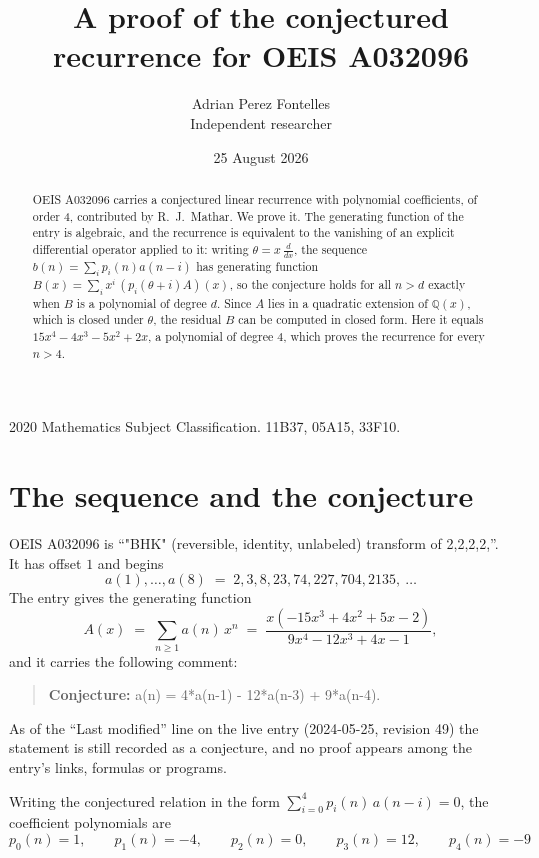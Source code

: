 \documentclass[11pt,a4paper]{article}
\title{A proof of the conjectured recurrence for OEIS A032096}
\author{Adrian Perez Fontelles\\ \small Independent researcher}
\date{25 August 2026}
\theoremstyle{plain}
\theoremstyle{definition}
\begin{document}
\maketitle

\begin{abstract}
OEIS A032096 carries a conjectured linear recurrence with polynomial coefficients, of
order 4, contributed by R.~J.~Mathar. We prove it. The generating function of the
entry is algebraic, and the recurrence is equivalent to the vanishing of an explicit
differential operator applied to it: writing $\theta=x\,\frac{d}{dx}$, the sequence
$b(n)=\sum_{i}p_{i}(n)a(n-i)$ has generating function
$B(x)=\sum_{i}x^{i}\,(p_{i}(\theta+i)A)(x)$, so the conjecture holds for all $n>d$ exactly
when $B$ is a polynomial of degree $d$. Since $A$ lies in a quadratic extension of
$\mathbb{Q}(x)$, which is closed under $\theta$, the residual $B$ can be computed in
closed form. Here it equals $15 x^{4} - 4 x^{3} - 5 x^{2} + 2 x$, a polynomial of degree $4$, which proves
the recurrence for every $n>4$.
\end{abstract}

\noindent\small 2020 Mathematics Subject Classification. 11B37, 05A15, 33F10.\normalsize

\section{The sequence and the conjecture}

OEIS A032096 is ``"BHK" (reversible, identity, unlabeled) transform of 2,2,2,2,''. It has offset $1$ and begins
\[
a(1),\dots,a(8)\;=\;2, 3, 8, 23, 74, 227, 704, 2135,\ \dots
\]
The entry gives the generating function
\begin{equation}\label{eq:gf}
A(x)\;=\;\sum_{n\ge 1} a(n)\,x^{n}\;=\;\frac{x \left(- 15 x^{3} + 4 x^{2} + 5 x - 2\right)}{9 x^{4} - 12 x^{3} + 4 x - 1} ,
\end{equation}
and it carries the following comment:
\begin{quote}\small
\textbf{Conjecture:} a(n) = 4*a(n-1) - 12*a(n-3) + 9*a(n-4).
\end{quote}
As of the ``Last modified'' line on the live entry (2024-05-25, revision 49) the
statement is still recorded as a conjecture, and no proof appears among the entry's links,
formulas or programs.

Writing the conjectured relation in the form $\sum_{i=0}^{4}p_{i}(n)\,a(n-i)=0$,
the coefficient polynomials are
\[
p_{0}(n)=1,\qquad p_{1}(n)=-4,\qquad p_{2}(n)=0,\qquad p_{3}(n)=12,\qquad p_{4}(n)=-9
\]
\end{document}
